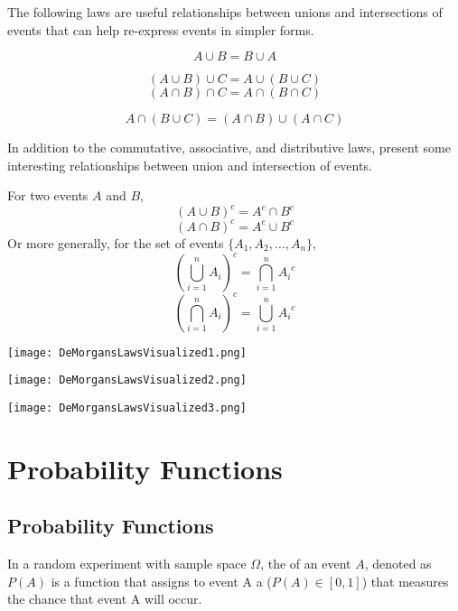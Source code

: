 The following laws are useful relationships between unions and intersections of events that can help re-express events in simpler forms.

\begin{theorem}
    $$A \cup B = B \cup A$$
\end{theorem}

\begin{theorem}
    $$(A \cup B) \cup C = A \cup (B \cup C)$$
    $$(A \cap B) \cap C = A \cap (B \cap C)$$
\end{theorem}

\begin{theorem}
    $$A \cap (B \cup C) = (A \cap B) \cup (A \cap C)$$
\end{theorem}

In addition to the commutative, associative, and distributive laws,  present some interesting relationships between union and intersection of events.

\begin{theorem}
    For two events $A$ and $B$, 
    $$(A \cup B)^c = A^c \cap B^c$$
    $$(A \cap B)^c = A^c \cup B^c$$
    Or more generally, for the set of events $\{ A_1, A_2, \dots, A_n \}$, 
    $$\left( \bigcup_{i=1}^n A_i \right)^c = \bigcap_{i=1}^n {A_i}^c$$
    $$\left( \bigcap_{i=1}^n A_i \right)^c = \bigcup_{i=1}^n {A_i}^c$$
\end{theorem}

\begin{center}
    \texttt{[image: DeMorgansLawsVisualized1.png]}

    \texttt{[image: DeMorgansLawsVisualized2.png]}

    \texttt{[image: DeMorgansLawsVisualized3.png]}
\end{center}

\section{Probability Functions}

\subsection{Probability Functions}

\begin{definition}[Probability]
    In a random experiment with sample space $\Omega$, the  of an event $A$, denoted as $P(A)$ is a function that assigns to event A a  ($P(A) \in [0, 1]$) that measures the chance that event A will occur. 
\end{definition}

